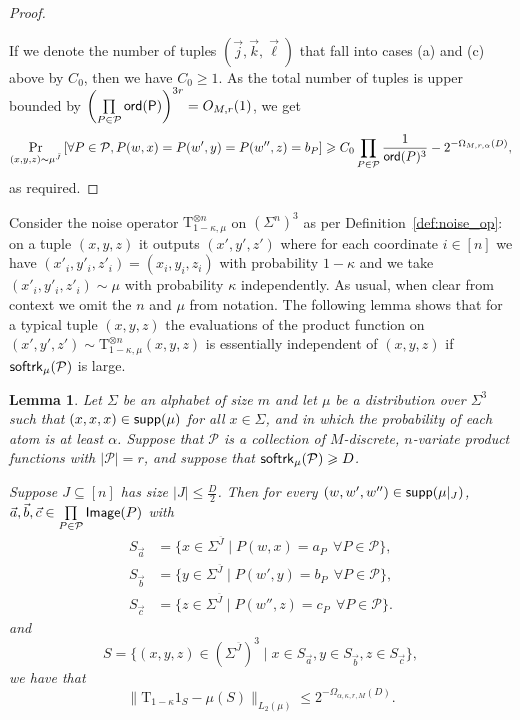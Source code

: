 \documentclass[10pt,a4paper]{amsart}
\newtheorem{lemma}[thm]{Lemma}
\newcommand\Prob[2]{{\Pr_{#1}\left[ {#2} \right]}}
\newcommand\norm[1]{\| #1 \|}
\renewcommand\geq{\geqslant}
\renewcommand\leq{\leqslant}
\begin{document}
\begin{proof}
\begin{enumerate}
     \end{enumerate}
     If we denote the number of tuples $(\vec{j}, \vec{k}, \vec{\ell})$ that fall into cases (a) and (c) above by $C_0$, then we have $C_0\geq 1$. As the total number of tuples is upper bounded by $\left(\prod\limits_{P\in\mathcal{P}} {\sf ord (P)}\right)^{3r} = O_{M, r}(1)$, we get 
       \begin{align*}
          \Prob{(x,y,z)\sim\mu^{\bar{J}}}{\forall P\in \mathcal{P}, P(w,x)=P(w', y)=P(w'', z) = b_P}\geq C_0\prod\limits_{P\in\mathcal{P}}\frac{1}{{\sf ord}(P)^3}-2^{-\Omega_{M,r,\alpha}(D)},
      \end{align*}
      as required.
    \end{proof}

Consider the noise operator $\mathrm{T}_{1-\kappa,\mu}^{\otimes n}$ on $(\Sigma^n)^3$ as per Definition~\ref{def:noise_op}: on a tuple $(x, y, z)$ it outputs $(x', y', z')$ where for each coordinate $i\in [n]$ we have $(x'_i,y'_i,z'_i) = (x_i, y_i, z_i)$ with probability $1-\kappa$ and we take $(x'_i,y'_i,z'_i)\sim \mu$  with probability $\kappa$ independently. As usual, when clear from context we omit the $n$ and $\mu$ from notation. The following lemma shows that for a typical tuple $(x, y, z)$ the evaluations of the product function on $(x',y',z')\sim \mathrm{T}_{1-\kappa,\mu}^{\otimes n}(x, y, z)$ is essentially independent of $(x, y, z)$ if ${\sf softrk}_{\mu}(\mathcal{P})$ is large.
\begin{lemma}
\label{lemma:noise_condition_uniform}
    Let $\Sigma$ be an alphabet of size $m$ and let $\mu$ be a distribution over $\Sigma^{3}$ such that $(x,x,x)\in {\sf supp}(\mu)$ for all $x\in\Sigma$, and in which the probability of each atom is at least $\alpha$.
		Suppose that $\mathcal{P}$ is a collection of $M$-discrete, $n$-variate product functions with $|\mathcal{P}|=r$, and suppose that ${\sf softrk}_{\mu}(\mathcal{P})\geq D$. 
        
        Suppose $J\subseteq [n]$ has size $|J|\leq \frac{D}{2}$. Then for every $(w, w', w'') \in {\sf supp}(\mu|_{J})$, $\vec{a},\vec{b}, \vec{c} \in\prod\limits_{P\in\mathcal{P}}{\sf Image}(P)$ with 
       \begin{align*}
           S_{\vec{a}} &= \{ x\in \Sigma^{\overline{J}} \mid P(w, x) = a_P~~\forall P\in \mathcal{P}\},\\
         S_{\vec{b}} &= \{ y\in \Sigma^{\overline{J}} \mid P(w', y) = b_P~~\forall P\in \mathcal{P}\}, \\
           S_{\vec{c}} &= \{ z\in \Sigma^{\overline{J}} \mid P(w'', z) = c_P~~\forall P\in \mathcal{P}\}.
       \end{align*}
       and
        \[
        S = \{ (x, y, z) \in (\Sigma^{\overline{J}})^3 \mid x\in S_{\vec{a}}, y\in S_{\vec{b}}, z\in S_{\vec{c}}\},
        \]
        we have that
		\[
        \norm{\mathrm{T}_{1-\kappa}1_S - \mu(S)}_{L_2(\mu)} \leq 2^{-\Omega_{\alpha, \kappa, r, M}(D)}.
        \]
	\end{lemma}
\end{document}
